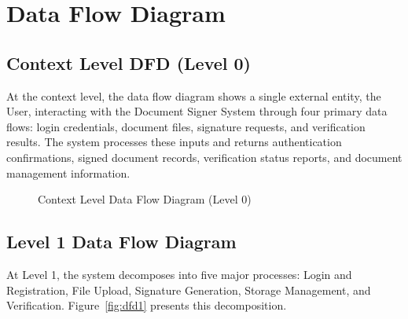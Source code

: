 \section{Data Flow Diagram}

\subsection{Context Level DFD (Level 0)}

At the context level, the data flow diagram shows a single external entity, the User, interacting with the Document Signer System through four primary data flows: login credentials, document files, signature requests, and verification results. The system processes these inputs and returns authentication confirmations, signed document records, verification status reports, and document management information.

\begin{figure}[H]
\centering
{}
\caption{Context Level Data Flow Diagram (Level 0)}
\label{fig:dfd0}
\end{figure}

\subsection{Level 1 Data Flow Diagram}

At Level 1, the system decomposes into five major processes: Login and Registration, File Upload, Signature Generation, Storage Management, and Verification. Figure~\ref{fig:dfd1} presents this decomposition.

